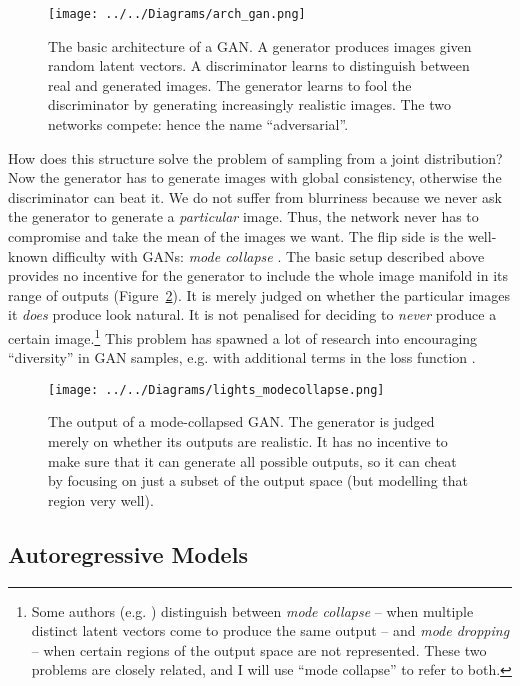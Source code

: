 \documentclass[11pt, a4paper, openany]{book}
\newcommand{\nquote}[1]{``{#1}''}
\begin{document}
\begin{figure}
  \centering
  \texttt{[image: ../../Diagrams/arch\_gan.png]}
  \caption[Architecture of a GAN]{The basic architecture of a GAN. A generator produces images given random latent vectors. A discriminator learns to distinguish between real and generated images. The generator learns to fool the discriminator by generating increasingly realistic images. The two networks compete: hence the name \nquote{adversarial}.}
  \label{archgan}
\end{figure}

How does this structure solve the problem of sampling from a joint distribution? Now the generator has to generate images with global consistency, otherwise the discriminator can beat it. We do not suffer from blurriness because we never ask the generator to generate a \emph{particular} image. Thus, the network never has to compromise and take the mean of the images we want. The flip side is the well-known difficulty with GANs: \emph{mode collapse} \citep{gantechniques}. The basic setup described above provides no incentive for the generator to include the whole image manifold in its range of outputs (Figure~\ref{modecollapse}). It is merely judged on whether the particular images it \emph{does} produce look natural. It is not penalised for deciding to \emph{never} produce a certain image.\footnote{Some authors (e.g. \citet{ganmetrics}) distinguish between \emph{mode collapse} -- when multiple distinct latent vectors come to produce the same output -- and \emph{mode dropping} -- when certain regions of the output space are not represented. These two problems are closely related, and I will use \nquote{mode collapse} to refer to both.} This problem has spawned a lot of research into encouraging \nquote{diversity} in GAN samples, e.g. with additional terms in the loss function \citep{gantechniques,energygan,unrolledgan,wgan}.

\begin{figure}
  \centering
  \texttt{[image: ../../Diagrams/lights\_modecollapse.png]}
  \caption[Output of a mode-collapsed GAN]{The output of a mode-collapsed GAN. The generator is judged merely on whether its outputs are realistic. It has no incentive to make sure that it can generate all possible outputs, so it can cheat by focusing on just a subset of the output space (but modelling that region very well).}
  \label{modecollapse}
\end{figure}

\subsection{Autoregressive Models}
\end{document}
